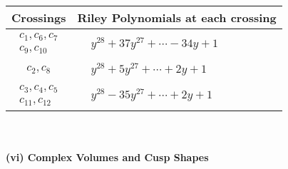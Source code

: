 \documentclass[1p]{elsarticle_modified}
\theoremstyle{definition}
\begin{document}
\begin{tabular}{m{50pt}|m{274pt}}
Crossings & \hspace{64pt}Riley Polynomials at each crossing \\
\hline $$\begin{aligned}c_{1},c_{6},c_{7}\\c_{9},c_{10}\end{aligned}$$&$\begin{aligned}
&y^{28}+37 y^{27}+\cdots-34 y+1
\end{aligned}$\\
\hline $$\begin{aligned}c_{2},c_{8}\end{aligned}$$&$\begin{aligned}
&y^{28}+5 y^{27}+\cdots+2 y+1
\end{aligned}$\\
\hline $$\begin{aligned}c_{3},c_{4},c_{5}\\c_{11},c_{12}\end{aligned}$$&$\begin{aligned}
&y^{28}-35 y^{27}+\cdots+2 y+1
\end{aligned}$\\
\hline
\end{tabular}\\~\\
\newpage\flushleft \textbf{(vi) Complex Volumes and Cusp Shapes}
\end{document}
